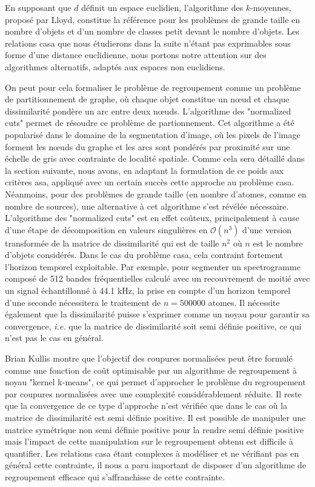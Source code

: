 En supposant que $d$ définit un espace euclidien, l'algorithme des $k$-moyennes, proposé par Lloyd\cite{lloyd1982least}, constitue la référence pour les problèmes de grande taille en nombre d'objets et d'un nombre de classes petit devant le nombre d'objets. Les relations casa que nous étudierons dans la suite n'étant pas exprimables sous forme d'une distance euclidienne, nous portons notre attention sur des algorithmes alternatifs, adaptés aux espaces non euclidiens.

On peut pour cela formaliser le problème de regroupement comme un problème de partitionnement de graphe, où chaque objet constitue un n\oe{}ud et chaque dissimilarité pondère un arc entre deux n\oe{}uds. L'algorithme des "normalized cuts" permet de résoudre ce problème de partionnement. Cet algorithme a été popularisé dans le domaine de la segmentation d'image\cite{shi2000normalized}, où les pixels de l'image forment les n\oe{}uds du graphe et les arcs sont pondérés par proximité sur une échelle de gris avec contrainte de localité spatiale. Comme cela sera détaillé dans la section suivante, nous avons, en adaptant la formulation de ce poids aux critères asa, appliqué avec un certain succès cette approche au problème casa. Néanmoins, pour des problèmes de grande taille (en nombre d'atomes, comme en nombre de sources), une alternative à cet algorithme s'est révélée nécessaire. L'algorithme des "normalized cuts" est en effet coûteux, principalement à cause d'une étape de décomposition en valeurs singulières en $\mathcal{O}(n^3)$ d'une version transformée de la matrice de dissimilarité qui est de taille $n^2$ où $n$ est le nombre d'objets considérés. Dans le cas du problème casa, cela contraint fortement l'horizon temporel exploitable. Par exemple, pour segmenter un spectrogramme composé de 512 bandes fréquentielles calculé avec un recouvrement de moitié avec un signal échantillonné à 44.1 kHz, la prise en compte d'un horizon temporel d'une seconde nécessitera le traitement de $n=500 000$ atomes. Il nécessite également que la dissimilarité puisse s'exprimer comme un noyau pour garantir sa convergence, \textit{i.e.} que la matrice de dissimilarité soit semi définie positive, ce qui n'est pas le cas en général.

Brian Kullis montre que l'objectif des coupures normalisées peut être formulé comme une fonction de coût optimisable par un algorithme de regroupement à noyau "kernel k-means", ce qui permet d'approcher le problème du regroupement par coupures normalisées avec une complexité considérablement réduite. Il reste que la convergence de ce type d'approche n'est vérifiée que dans le cas où la matrice de dissimilarité est semi définie positive. Il est possible de manipuler une matrice symétrique non semi définie positive pour la rendre semi définie positive\cite{optimal2003} mais l'impact de cette manipulation sur le regroupement obtenu est difficile à quantifier. Les relations casa étant complexes à modéliser et ne vérifiant pas en général cette contrainte, il nous a paru important de disposer d'un algorithme de regroupement efficace qui s'affranchisse de cette contrainte.

